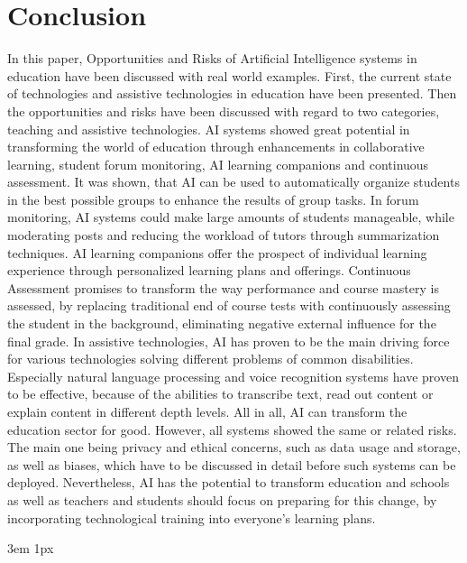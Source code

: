 \documentclass{Academic}
\begin{document}
    \section{Conclusion}
    In this paper, Opportunities and Risks of Artificial Intelligence systems in education have been discussed with real world examples. First, the current state of technologies and assistive technologies in education have been presented. Then the opportunities and risks have been discussed with regard to two categories, teaching and assistive technologies. AI systems showed great potential in transforming the world of education through enhancements in collaborative learning, student forum monitoring, AI learning companions and continuous assessment. It was shown, that AI can be used to automatically organize students in the best possible groups to enhance the results of group tasks. In forum monitoring, AI systems could make large amounts of students manageable, while moderating posts and reducing the workload of tutors through summarization techniques. AI learning companions offer the prospect of individual learning experience through personalized learning plans and offerings. Continuous Assessment promises to transform the way performance and course mastery is assessed, by replacing traditional end of course tests with continuously assessing the student in the background, eliminating negative external influence for the final grade. In assistive technologies, AI has proven to be the main driving force for various technologies solving different problems of common disabilities. Especially natural language processing and voice recognition systems have proven to be effective, because of the abilities to transcribe text, read out content or explain content in different depth levels. All in all, AI can transform the education sector for good. However, all systems showed the same or related risks. The main one being privacy and ethical concerns, such as data usage and storage, as well as biases, which have to be discussed in detail before such systems can be deployed. Nevertheless, AI has the potential to transform education and schools as well as teachers and students should focus on preparing for this change, by incorporating technological training into everyone's learning plans.

    \singlespacing
    \emergencystretch 3em
    \hfuzz 1px
    \printbibliography[heading=bibnumbered]




\end{document}
